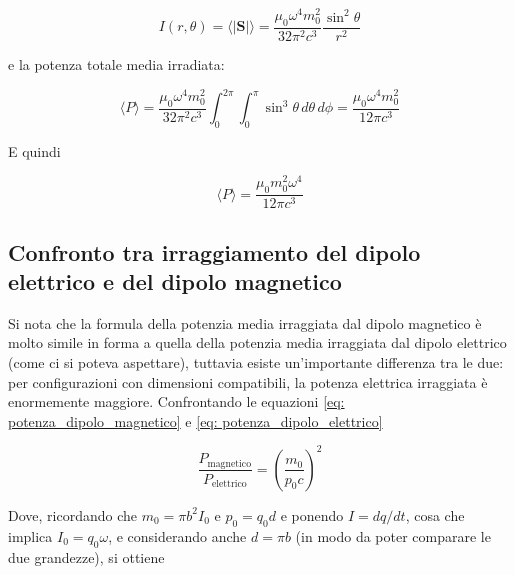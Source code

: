 \begin{tcolorbox}[colback=yellow!10!white, colframe=orange!70!black, boxrule=0.8pt]
\begin{equation}
    I(r, \theta) = \langle |\mathbf{S}| \rangle = \frac{\mu_0 \omega^4 m_0^2}{32\pi^2 c^3} \frac{\sin^2\theta}{r^2}
\end{equation}
\end{tcolorbox}

e la potenza totale media irradiata:

\begin{equation}
    \langle P \rangle = \frac{\mu_0 \omega^4 m_0^2}{32\pi^2 c^3} \int_0^{2\pi}\int_0^{\pi} \sin^3\theta \, d\theta \, d\phi = \frac{\mu_0 \omega^4 m_0^2}{12\pi c^3}
\end{equation}

E quindi

\begin{tcolorbox}[colback=yellow!10!white, colframe=orange!70!black, boxrule=0.8pt]
\begin{equation}\label{eq: potenza_dipolo_magnetico}
    \langle P \rangle = \frac{\mu_0 m_0^2 \omega^4}{12\pi c^3}
\end{equation}
\end{tcolorbox}

\subsection{Confronto tra irraggiamento del dipolo elettrico e del dipolo magnetico}

Si nota che la formula della potenzia media irraggiata dal dipolo magnetico è molto simile in forma a quella della potenzia media irraggiata dal dipolo elettrico (come ci si poteva aspettare), tuttavia esiste un'importante differenza tra le due: per configurazioni con dimensioni compatibili, la potenza elettrica irraggiata è enormemente maggiore. 
Confrontando le equazioni \eqref{eq: potenza_dipolo_magnetico} e \eqref{eq: potenza_dipolo_elettrico} 

\begin{equation}
    \frac{P_{\text{magnetico}}}{P_{\text{elettrico}}} = \left( \frac{m_0}{p_0 c} \right)^2
\end{equation}

Dove, ricordando che $m_0 = \pi b^2 I_0$ e $p_0 = q_0 d$ e ponendo $I = dq/dt$, cosa che implica $I_0 = q_0 \omega$, e considerando anche $d = \pi b$ (in modo da poter comparare le due grandezze), si ottiene

